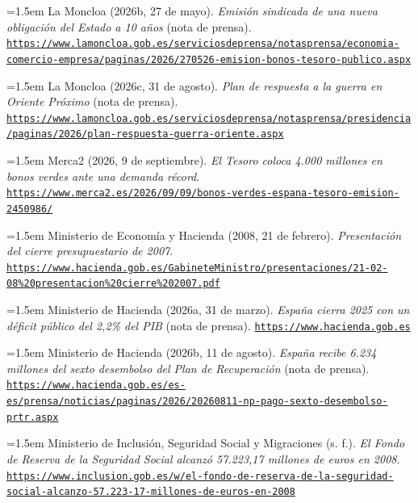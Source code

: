 \documentclass[10pt,a4paper]{article}
\begin{document}
\noindent\hangindent=1.5em La Moncloa (2026b, 27 de mayo). \textit{Emisión sindicada de una nueva obligación del Estado a 10 años} (nota de prensa). \href{https://www.lamoncloa.gob.es/serviciosdeprensa/notasprensa/economia-comercio-empresa/paginas/2026/270526-emision-bonos-tesoro-publico.aspx}{\nolinkurl{https://www.lamoncloa.gob.es/serviciosdeprensa/notasprensa/economia-comercio-empresa/paginas/2026/270526-emision-bonos-tesoro-publico.aspx}}

\noindent\hangindent=1.5em La Moncloa (2026c, 31 de agosto). \textit{Plan de respuesta a la guerra en Oriente Próximo} (nota de prensa). \href{https://www.lamoncloa.gob.es/serviciosdeprensa/notasprensa/presidencia/paginas/2026/plan-respuesta-guerra-oriente.aspx}{\nolinkurl{https://www.lamoncloa.gob.es/serviciosdeprensa/notasprensa/presidencia/paginas/2026/plan-respuesta-guerra-oriente.aspx}}

\noindent\hangindent=1.5em Merca2 (2026, 9 de septiembre). \textit{El Tesoro coloca 4.000 millones en bonos verdes ante una demanda récord}. \href{https://www.merca2.es/2026/09/09/bonos-verdes-espana-tesoro-emision-2450986/}{\nolinkurl{https://www.merca2.es/2026/09/09/bonos-verdes-espana-tesoro-emision-2450986/}}

\noindent\hangindent=1.5em Ministerio de Economía y Hacienda (2008, 21 de febrero). \textit{Presentación del cierre presupuestario de 2007}. \href{https://www.hacienda.gob.es/GabineteMinistro/presentaciones/21-02-08\%20presentacion\%20cierre\%202007.pdf}{\nolinkurl{https://www.hacienda.gob.es/GabineteMinistro/presentaciones/21-02-08\%20presentacion\%20cierre\%202007.pdf}}

\noindent\hangindent=1.5em Ministerio de Hacienda (2026a, 31 de marzo). \textit{España cierra 2025 con un déficit público del 2,2\% del PIB} (nota de prensa). \href{https://www.hacienda.gob.es}{\nolinkurl{https://www.hacienda.gob.es}}

\noindent\hangindent=1.5em Ministerio de Hacienda (2026b, 11 de agosto). \textit{España recibe 6.234 millones del sexto desembolso del Plan de Recuperación} (nota de prensa). \href{https://www.hacienda.gob.es/es-es/prensa/noticias/paginas/2026/20260811-np-pago-sexto-desembolso-prtr.aspx}{\nolinkurl{https://www.hacienda.gob.es/es-es/prensa/noticias/paginas/2026/20260811-np-pago-sexto-desembolso-prtr.aspx}}

\noindent\hangindent=1.5em Ministerio de Inclusión, Seguridad Social y Migraciones (s. f.). \textit{El Fondo de Reserva de la Seguridad Social alcanzó 57.223,17 millones de euros en 2008}. \href{https://www.inclusion.gob.es/w/el-fondo-de-reserva-de-la-seguridad-social-alcanzo-57.223-17-millones-de-euros-en-2008}{\nolinkurl{https://www.inclusion.gob.es/w/el-fondo-de-reserva-de-la-seguridad-social-alcanzo-57.223-17-millones-de-euros-en-2008}}
\end{document}
